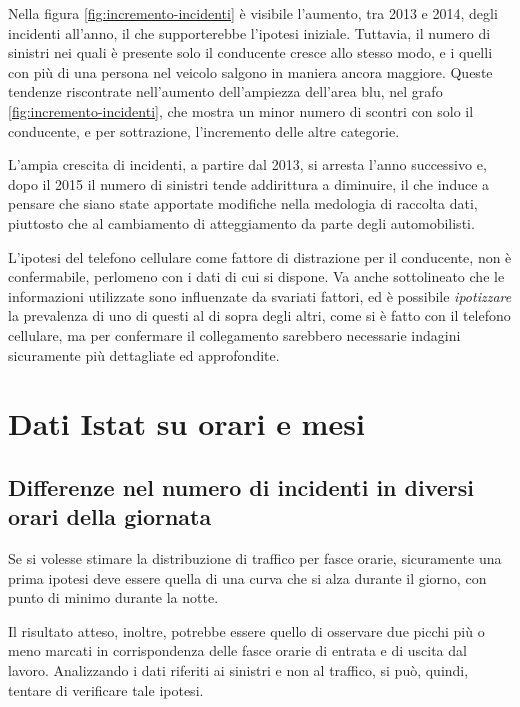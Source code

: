 \documentclass[a4paper,12pt]{report}
\newcommand{\quotestyle}[1]{\textit{#1}}
\begin{document}
Nella figura \ref{fig:incremento-incidenti} è visibile l'aumento, tra 2013 e 2014, degli 
incidenti all'anno, il che supporterebbe l'ipotesi iniziale. 
Tuttavia, il numero di sinistri nei quali è presente solo il conducente 
cresce allo stesso modo, e i quelli con più di una persona nel veicolo 
salgono in maniera ancora maggiore. 
Queste tendenze riscontrate nell'aumento dell'ampiezza dell'area blu, nel grafo 
\ref{fig:incremento-incidenti}, che mostra un minor numero di scontri con solo il conducente, 
e per sottrazione, l'incremento delle altre categorie. 

L'ampia crescita di incidenti, a partire dal 2013, si arresta l'anno successivo e, 
dopo il 2015 il numero di sinistri tende addirittura a diminuire, 
il che induce a pensare che siano state apportate modifiche nella medologia 
di raccolta dati, piuttosto che al cambiamento di atteggiamento da parte degli automobilisti.

L'ipotesi del telefono cellulare come fattore di distrazione per il conducente, 
non è confermabile, perlomeno con i dati di cui si dispone. 
Va anche sottolineato che le informazioni utilizzate sono influenzate da svariati fattori, ed è 
possibile \quotestyle{ipotizzare} la prevalenza di uno di questi al di sopra degli altri, 
come si è fatto con il telefono cellulare, 
ma per confermare il collegamento sarebbero necessarie indagini sicuramente 
più dettagliate ed approfondite.

\section{Dati Istat su orari e mesi}

\subsection{Differenze nel numero di incidenti in diversi orari della giornata}

Se si volesse stimare la distribuzione di traffico per fasce orarie, 
sicuramente una prima ipotesi 
deve essere quella di una curva che si alza durante il giorno, con 
punto di minimo durante la notte. 

Il risultato atteso, inoltre, potrebbe essere 
quello di osservare due picchi più o meno marcati 
in corrispondenza delle fasce orarie di entrata e di uscita dal lavoro. 
Analizzando i dati riferiti ai sinistri e non al traffico, si può, 
quindi, tentare di verificare tale ipotesi.
\end{document}
